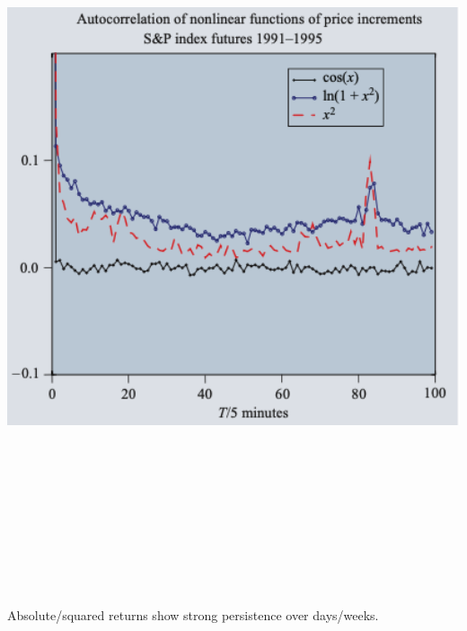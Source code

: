 \documentclass[final]{beamer}
\begin{document}
\begin{frame}[t]
\begin{columns}[t]
\begin{column}{.48\linewidth}


\vspace{0.5cm}

\begin{tcolorbox}[mybox, title=Nonlinear Correlations]
\begin{center}
\includegraphics[width=0.95\linewidth,height=22cm,keepaspectratio]{figure8_nonlinear.png}
\end{center}
\vspace{0.3cm}
\large
Absolute/squared returns show strong persistence over days/weeks.
\end{tcolorbox}


\end{column}
\end{columns}
\end{frame}
\end{document}

